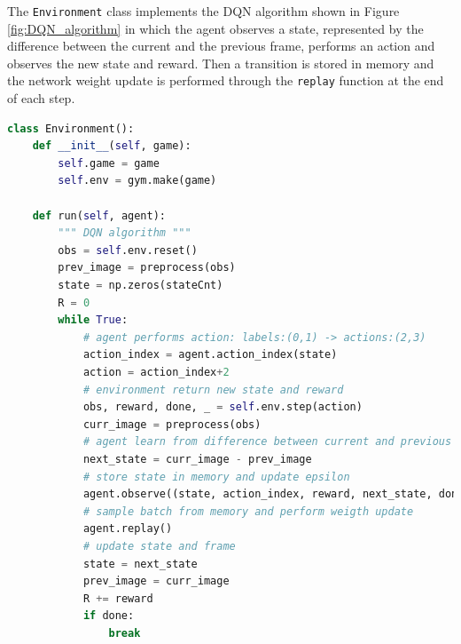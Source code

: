 \documentclass[a4paper, 11pt]{article}
\begin{document}
The \texttt{Environment} class implements the DQN algorithm shown in Figure \ref{fig:DQN_algorithm} in which the agent observes a state, represented by the difference between the current and the previous frame, performs an action and observes the new state and reward. Then a transition is stored in memory and the network weight update is performed through the \texttt{replay} function at the end of each step. 
\begin{lstlisting}[language=Python, caption=DQN Environment definition, label={lst:DQN-environment}]
class Environment():    
    def __init__(self, game):
        self.game = game
        self.env = gym.make(game)
        
    def run(self, agent):
        """ DQN algorithm """
        obs = self.env.reset()
        prev_image = preprocess(obs)
        state = np.zeros(stateCnt)
        R = 0       
        while True:       
            # agent performs action: labels:(0,1) -> actions:(2,3)
            action_index = agent.action_index(state)
            action = action_index+2
            # environment return new state and reward
            obs, reward, done, _ = self.env.step(action)
            curr_image = preprocess(obs)
            # agent learn from difference between current and previous frame
            next_state = curr_image - prev_image            
            # store state in memory and update epsilon
            agent.observe((state, action_index, reward, next_state, done))
            # sample batch from memory and perform weigth update 
            agent.replay()
            # update state and frame
            state = next_state
            prev_image = curr_image
            R += reward
            if done:                    
                break

\end{lstlisting}
\end{document}
